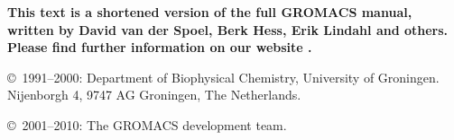 \documentclass[11pt,a4paper,twoside]{gmxmanual}
\newcommand{\gmxlite}{0}
\begin{document}
\ifthenelse{\equal{\gmxlite}{1}} 
{
\newpage
{\bf
This text is a shortened version of the full GROMACS manual, written
by David van der Spoel, Berk Hess, Erik Lindahl and others. Please
find further information on our website {\wwwpage}.}

\vspace{2cm}

\noindent \copyright\ 1991--2000: 
Department of Biophysical Chemistry, University of Groningen. 
Nijenborgh 4, 9747 AG Groningen, The Netherlands.\\
\medskip

\noindent \copyright\ 2001--2010:
The GROMACS development team.\\
} 
{ 
\cleardoublepage
} %
\addtolength{\oddsidemargin}{5mm}

%
%
\renewcommand{\chaptermark}[1]{\markboth{#1}{#1}} %
\renewcommand{\sectionmark}[1]{\markright{\thesection\ #1}}
\lhead[\fancyplain{}{\em\thepage}]{\fancyplain{}{\em\rightmark}}
\rhead[\fancyplain{}{\em\leftmark}]{\fancyplain{}{\em\thepage}}
\cfoot{}
\end{document}
